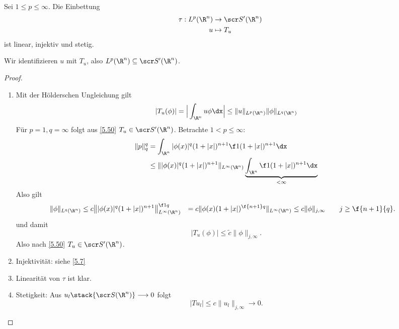 \begin{df} \label{5.53}
	Sei $1 \le p \le \infty$.
	Die Einbettung
	\begin{align*}
		\tau : L^p (\R^n) &\to \scr S'(\R^n) \\
		u &\mapsto T_u
	\end{align*}
	ist linear, injektiv und stetig.
	
	Wir identifizieren $u$ mit $T_u$, also $L^p(\R^n) \subset \scr S'(\R^n)$.
	\begin{proof}
		\begin{enumerate}[1)]
			\item
				Mit der Hölderschen Ungleichung gilt
				\[
					|T_u(\phi)|
					= \Big|\int_{\R^n} u\phi \dx \Big|
					\le \|u\|_{L^p(\R^n)} \|\phi\|_{L^q(\R^n)}
				\]
				Für $p = 1, q = \infty$ folgt aus \ref{5.50} $T_u \in \scr S'(\R^n)$.
				Betrachte $1 < p \le \infty$:
				\begin{align*}
					\|p\|_q^q
					&= \int_{\R^n} |\phi(x)|^q (1+|x|)^{n+1} \f 1{(1+|x|)^{n+1}} \dx \\
					&\le \||\phi(x)|^q(1+|x|)^{n+1}\|_{L^\infty(\R^n)} \underbrace{\int_{\R^n} \f 1{(1+|x|)^{n+1}} \dx}_{< \infty}
				\end{align*}
				Also gilt
				\begin{align*}
					\|\phi\|_{L^q(\R^n)}
					&\le c \big\| |\phi(x)|^q (1+|x|)^{n+1}\big\|_{L^\infty(\R^n)}^{\f 1q}
					&= c \| \phi(x) (1+|x|)^{\f {n+1}q} \|_{L^\infty(\R^n)}
					&\le c \|\phi\|_{j,\infty} \qquad j \ge \f {n+1}{q}.
				\end{align*}
				und damit
				\[
					|T_u (\phi)| \le \tilde c \|\phi\|_{j,\infty}.
				\]
				Also nach \ref{5.50} $T_u \in \scr S'(\R^n)$.
			\item
				Injektivität: siehe \ref{5.7}
			\item
				Linearität von $\tau$ ist klar.
			\item
				Stetigkeit:
				Aus $u_l \stack{\scr S(\R^n)} \longrightarrow 0$ folgt
				\[
					|Tu_l| \le c \|u_l\|_{j,\infty} \to 0.
				\]
		\end{enumerate}
	\end{proof}
\end{df}
